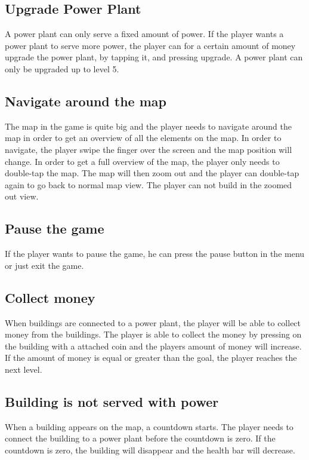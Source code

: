 \subsection*{Upgrade Power Plant}

	A power plant can only serve a fixed amount of power. If the player wants a power
	plant to serve more power, the player can for a certain amount of money upgrade the power 
	plant, by tapping it, and pressing upgrade. A power plant can only be upgraded up to level 5.

\subsection*{Navigate around the map}
	
	The map in the game is quite big and the player needs to navigate around
	the map in order to get an overview of all the elements on the map. 
	In order to navigate, the player swipe the finger over the screen and the 
	map position will change. In order to get a full overview of the map, the player
	only needs to double-tap the map. The map will then zoom out and the player
	can double-tap again to go back to normal map view. The player can not build in 
	the zoomed out view.

\subsection*{Pause the game}

	If the player wants to pause the game, he can press the pause button in 
	the menu or just exit the game. 

\subsection*{Collect money}
	
	When buildings are connected to a power plant, the player will be able to collect
	money from the buildings. The player is able to collect the money by pressing on the
	building with a attached coin and the players amount of money will increase. If
	the amount of money is equal or greater than the goal, the player reaches the next level.

\subsection*{Building is not served with power}

	When a building appears on the map, a countdown starts. The player needs to connect
	the building to a power plant before the countdown is zero. If the countdown is zero, 
	the building will disappear and the health bar will decrease.

